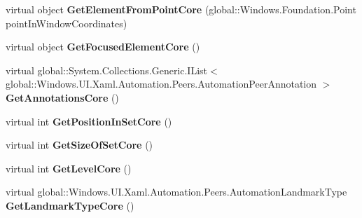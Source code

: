 \begin{DoxyCompactItemize}
virtual object {\bfseries Get\+Element\+From\+Point\+Core} (global\+::\+Windows.\+Foundation.\+Point point\+In\+Window\+Coordinates)
\item 
\mbox{\label{class_windows_1_1_u_i_1_1_xaml_1_1_automation_1_1_peers_1_1_automation_peer_afadb1e1f2c9abb79fa5e7189b24f159c}} 
virtual object {\bfseries Get\+Focused\+Element\+Core} ()
\item 
\mbox{\label{class_windows_1_1_u_i_1_1_xaml_1_1_automation_1_1_peers_1_1_automation_peer_ab6f0d05047a23ceac4c1969ba5a531c6}} 
virtual global\+::\+System.\+Collections.\+Generic.\+I\+List$<$ global\+::\+Windows.\+U\+I.\+Xaml.\+Automation.\+Peers.\+Automation\+Peer\+Annotation $>$ {\bfseries Get\+Annotations\+Core} ()
\item 
\mbox{\label{class_windows_1_1_u_i_1_1_xaml_1_1_automation_1_1_peers_1_1_automation_peer_a1bcb3ef7e7391852a768d6874d898f73}} 
virtual int {\bfseries Get\+Position\+In\+Set\+Core} ()
\item 
\mbox{\label{class_windows_1_1_u_i_1_1_xaml_1_1_automation_1_1_peers_1_1_automation_peer_a4f2274f1bbafc48d35ae4a1baaf68144}} 
virtual int {\bfseries Get\+Size\+Of\+Set\+Core} ()
\item 
\mbox{\label{class_windows_1_1_u_i_1_1_xaml_1_1_automation_1_1_peers_1_1_automation_peer_aa68b2502b978bd14d3692f0943c7ebe2}} 
virtual int {\bfseries Get\+Level\+Core} ()
\item 
\mbox{\label{class_windows_1_1_u_i_1_1_xaml_1_1_automation_1_1_peers_1_1_automation_peer_a16b5c59f62d9cfb375b06085b3ebface}} 
virtual global\+::\+Windows.\+U\+I.\+Xaml.\+Automation.\+Peers.\+Automation\+Landmark\+Type {\bfseries Get\+Landmark\+Type\+Core} ()
\item 
\mbox{\label{class_windows_1_1_u_i_1_1_xaml_1_1_automation_1_1_peers_1_1_automation_peer_a81ded2ee8cb403207b5438e524931e09}} 

\end{DoxyCompactItemize}
